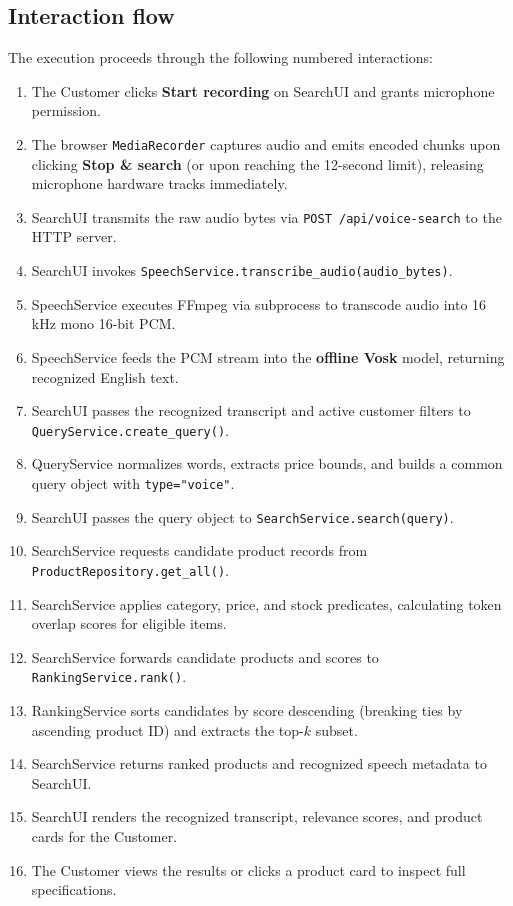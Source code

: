 \documentclass[12pt,a4paper]{article}
\newcommand{\code}[1]{\texttt{#1}}
\begin{document}
\subsection{Interaction flow}
The execution proceeds through the following numbered interactions:
\begin{enumerate}
\item The Customer clicks \textbf{Start recording} on SearchUI and grants microphone permission.
\item The browser \code{MediaRecorder} captures audio and emits encoded chunks upon clicking \textbf{Stop \& search} (or upon reaching the 12-second limit), releasing microphone hardware tracks immediately.
\item SearchUI transmits the raw audio bytes via \code{POST /api/voice-search} to the HTTP server.
\item SearchUI invokes \code{SpeechService.transcribe\_audio(audio\_bytes)}.
\item SpeechService executes FFmpeg via subprocess to transcode audio into 16 kHz mono 16-bit PCM.
\item SpeechService feeds the PCM stream into the \textbf{offline Vosk} model, returning recognized English text.
\item SearchUI passes the recognized transcript and active customer filters to \code{QueryService.create\_query()}.
\item QueryService normalizes words, extracts price bounds, and builds a common query object with \code{type="voice"}.
\item SearchUI passes the query object to \code{SearchService.search(query)}.
\item SearchService requests candidate product records from \code{ProductRepository.get\_all()}.
\item SearchService applies category, price, and stock predicates, calculating token overlap scores for eligible items.
\item SearchService forwards candidate products and scores to \code{RankingService.rank()}.
\item RankingService sorts candidates by score descending (breaking ties by ascending product ID) and extracts the top-$k$ subset.
\item SearchService returns ranked products and recognized speech metadata to SearchUI.
\item SearchUI renders the recognized transcript, relevance scores, and product cards for the Customer.
\item The Customer views the results or clicks a product card to inspect full specifications.
\end{enumerate}
\end{document}
